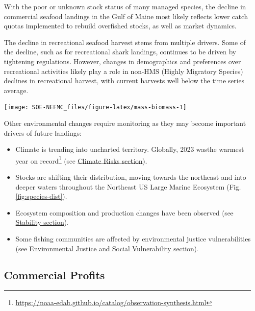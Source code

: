 \documentclass[
  10pt,
]{article}
\providecommand{\tightlist}{%
  \setlength{\itemsep}{0pt}\setlength{\parskip}{0pt}}
\let\origfigure\figure
\let\endorigfigure\endfigure
\renewenvironment{figure}[1][2] {
    \expandafter\origfigure\expandafter[H]
} {
    \endorigfigure
}
\begin{document}
With the poor or unknown stock status of many managed species, the decline in commercial seafood landings in the Gulf of Maine most likely reflects lower catch quotas implemented to rebuild overfished stocks, as well as market dynamics.

The decline in recreational seafood harvest stems from multiple drivers. Some of the decline, such as for recreational shark landings, continues to be driven by tightening regulations. However, changes in demographics and preferences over recreational activities likely play a role in non-HMS (Highly Migratory Species) declines in recreational harvest, with current harvests well below the time series average.

\begin{figure}

{\centering \texttt{[image: SOE-NEFMC\_files/figure-latex/mass-biomass-1]} 

}

\caption{Spring (left) and fall (right) surveyed biomass from the state of Massachusetts inshore survey. The shaded area around each annual mean represents 2 standard deviations from the mean.}\label{fig:mass-biomass}
\end{figure}

Other environmental changes require monitoring as they may become important drivers of future landings:

\begin{itemize}
\tightlist
\item
  Climate is trending into uncharted territory. Globally, 2023 wasthe warmest year on record\footnote{\url{https://noaa-edab.github.io/catalog/observation-synthesis.html}} (see \protect\hyperlink{climate-and-ecosystem-productivity}{Climate Risks section}).
\item
  Stocks are shifting their distribution, moving towards the northeast and into deeper waters throughout the Northeast US Large Marine Ecosystem (Fig. \ref{fig:species-dist}).
\item
  Ecosystem composition and production changes have been observed (see \protect\hyperlink{stability}{Stability section}).
\item
  Some fishing communities are affected by environmental justice vulnerabilities (see \protect\hyperlink{social-vulnerability}{Environmental Justice and Social Vulnerability section}).
\end{itemize}

\newpage

\hypertarget{commercial-profits}{%
\subsection{Commercial Profits}\label{commercial-profits}}
\end{document}
